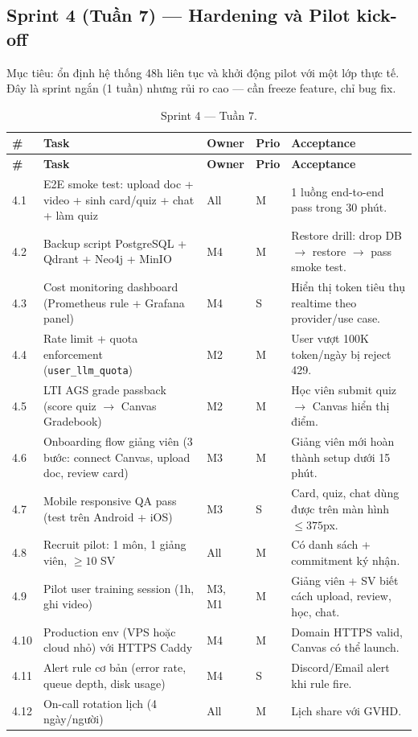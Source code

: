 \subsection{Sprint 4 (Tuần 7) --- Hardening và Pilot kick-off}
\label{subsec:sprint4-gd2}

Mục tiêu: ổn định hệ thống 48h liên tục và khởi động pilot với một lớp
thực tế. Đây là sprint ngắn (1 tuần) nhưng rủi ro cao --- cần freeze
feature, chỉ bug fix.

\begin{longtable}{|p{0.7cm}|p{6.3cm}|p{1.2cm}|p{1cm}|p{3cm}|}
    \caption{Sprint 4 --- Tuần 7.}
    \label{tab:sprint4-gd2} \\
    \hline
    \textbf{\#} & \textbf{Task} & \textbf{Owner} & \textbf{Prio} & \textbf{Acceptance} \\
    \hline
    \endfirsthead
    \hline
    \textbf{\#} & \textbf{Task} & \textbf{Owner} & \textbf{Prio} & \textbf{Acceptance} \\
    \hline
    \endhead

    4.1 & E2E smoke test: upload doc + video + sinh card/quiz + chat + làm quiz & All & M & 1 luồng end-to-end pass trong 30 phút. \\ \hline
    4.2 & Backup script PostgreSQL + Qdrant + Neo4j + MinIO & M4 & M & Restore drill: drop DB $\to$ restore $\to$ pass smoke test. \\ \hline
    4.3 & Cost monitoring dashboard (Prometheus rule + Grafana panel) & M4 & S & Hiển thị token tiêu thụ realtime theo provider/use case. \\ \hline
    4.4 & Rate limit + quota enforcement (\texttt{user\_llm\_quota}) & M2 & M & User vượt 100K token/ngày bị reject 429. \\ \hline
    4.5 & LTI AGS grade passback (score quiz $\to$ Canvas Gradebook) & M2 & M & Học viên submit quiz $\to$ Canvas hiển thị điểm. \\ \hline
    4.6 & Onboarding flow giảng viên (3 bước: connect Canvas, upload doc, review card) & M3 & M & Giảng viên mới hoàn thành setup dưới 15 phút. \\ \hline
    4.7 & Mobile responsive QA pass (test trên Android + iOS) & M3 & S & Card, quiz, chat dùng được trên màn hình $\leq 375$px. \\ \hline
    4.8 & Recruit pilot: 1 môn, 1 giảng viên, $\geq 10$ SV & All & M & Có danh sách + commitment ký nhận. \\ \hline
    4.9 & Pilot user training session (1h, ghi video) & M3, M1 & M & Giảng viên + SV biết cách upload, review, học, chat. \\ \hline
    4.10 & Production env (VPS hoặc cloud nhỏ) với HTTPS Caddy & M4 & M & Domain HTTPS valid, Canvas có thể launch. \\ \hline
    4.11 & Alert rule cơ bản (error rate, queue depth, disk usage) & M4 & S & Discord/Email alert khi rule fire. \\ \hline
    4.12 & On-call rotation lịch (4 ngày/người) & All & M & Lịch share với GVHD. \\ \hline
\end{longtable}

